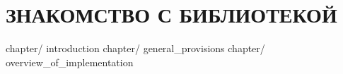 \part{ЗНАКОМСТВО С БИБЛИОТЕКОЙ}\label{logic:bibl}						

		{chapter/}	{introduction}						%
		{chapter/}	{general_provisions}				%
		{chapter/}	{overview_of_implementation}		%
